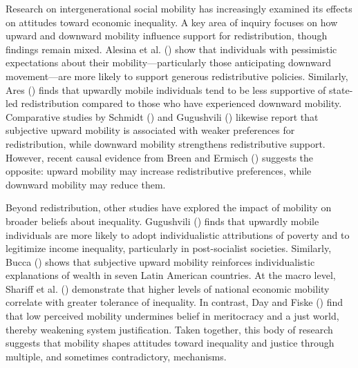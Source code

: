 \documentclass[
  13pt,
]{article}
\begin{document}
Research on intergenerational social mobility has increasingly examined
its effects on attitudes toward economic inequality. A key area of
inquiry focuses on how upward and downward mobility influence support
for redistribution, though findings remain mixed. Alesina et al.
() show that
individuals with pessimistic expectations about their
mobility---particularly those anticipating downward movement---are more
likely to support generous redistributive policies. Similarly, Ares
() finds that upwardly mobile
individuals tend to be less supportive of state-led redistribution
compared to those who have experienced downward mobility. Comparative
studies by Schmidt () and
Gugushvili () likewise
report that subjective upward mobility is associated with weaker
preferences for redistribution, while downward mobility strengthens
redistributive support. However, recent causal evidence from Breen and
Ermisch () suggests the opposite:
upward mobility may increase redistributive preferences, while downward
mobility may reduce them.

Beyond redistribution, other studies have explored the impact of
mobility on broader beliefs about inequality. Gugushvili
() finds that
upwardly mobile individuals are more likely to adopt individualistic
attributions of poverty and to legitimize income inequality,
particularly in post-socialist societies. Similarly, Bucca
() shows that subjective upward
mobility reinforces individualistic explanations of wealth in seven
Latin American countries. At the macro level, Shariff et al.
() demonstrate that higher
levels of national economic mobility correlate with greater tolerance of
inequality. In contrast, Day and Fiske
() find that low perceived mobility
undermines belief in meritocracy and a just world, thereby weakening
system justification. Taken together, this body of research suggests
that mobility shapes attitudes toward inequality and justice through
multiple, and sometimes contradictory, mechanisms.
\end{document}
